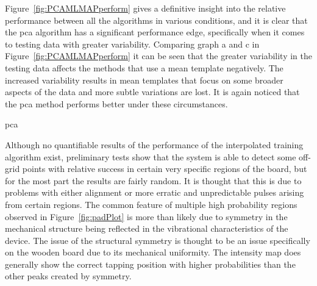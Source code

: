 Figure~\ref{fig:PCAMLMAPperform} gives a definitive insight into the relative performance between all the algorithms in various conditions, and it is clear that the \DIFdelbegin {}\DIFdelend \DIFaddbegin \gls{pca} \DIFaddend algorithm has a significant performance edge, specifically when it comes to testing data with greater variability. Comparing graph a and c in Figure~\ref{fig:PCAMLMAPperform} it can be seen that the greater variability in the testing data affects the methods that use a mean template negatively. The increased variability results in mean templates that focus on some broader aspects of the data and more subtle variations are lost. It is again noticed that the \DIFdelbegin {}\DIFdelend \DIFaddbegin \gls{pca} \DIFaddend method performs better under these circumstances.

\DIFaddbegin \label{corrections:LOO}\gls{pca} 

\DIFaddend Although no quantifiable results of the performance of the interpolated training algorithm exist, preliminary tests show that the system is able to detect some off- grid points with relative success in certain very specific regions of the board, but for the most part the results are fairly random. It is thought that this is due to problems with either alignment or more erratic and unpredictable pulses arising from certain regions. The common feature of multiple high probability regions observed in Figure~\ref{fig:padPlot} is more than likely due to symmetry in the mechanical structure being reflected in the vibrational characteristics of the device. The issue of the structural symmetry is thought to be an issue specifically on the wooden board due to its mechanical uniformity. The intensity map does generally show the correct tapping position with higher probabilities than the other peaks created by symmetry.

